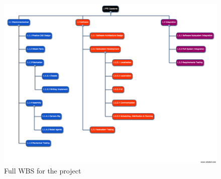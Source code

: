 \begin{figure}[h!]
\centering
\includegraphics[width=0.98\columnwidth]{wbs_schedule/wbs_1_31_17.png}
\caption{Full WBS for the project}
\label{fig:full-wbs}
\end{figure}
